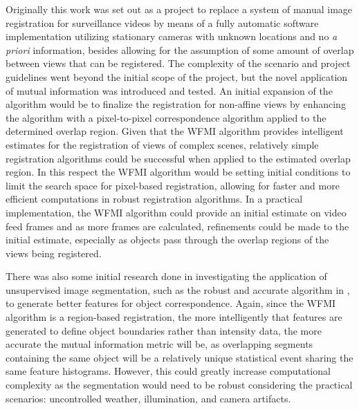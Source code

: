%
%
%
%
%
%

%
%
%



Originally this work was set out as a project to replace a system of manual image registration for surveillance videos by means of a fully automatic software implementation utilizing stationary cameras with unknown locations and no \textit{a priori} information, besides allowing for the assumption of some amount of overlap between views that can be registered. The complexity of the scenario and project guidelines went beyond the initial scope of the project, but the novel application of mutual information was introduced and tested. An initial expansion of the algorithm would be to finalize the registration for non-affine views by enhancing the algorithm with a pixel-to-pixel correspondence algorithm applied to the determined overlap region. Given that the WFMI algorithm provides intelligent estimates for the registration of views of complex scenes, relatively simple registration algorithms could be successful when applied to the estimated overlap region. In this respect the WFMI algorithm would be setting initial conditions to limit the search space for pixel-based registration, allowing for faster and more efficient computations in robust registration algorithms. In a practical implementation, the WFMI algorithm could provide an initial estimate on video feed frames and as more frames are calculated, refinements could be made to the initial estimate, especially as objects pass through the overlap regions of the views being registered.

There was also some initial research done in investigating the application of unsupervised image segmentation, such as the robust and accurate algorithm in \cite{Ugarriza2009}, to generate better features for object correspondence. Again, since the WFMI algorithm is a region-based registration, the more intelligently that features are generated to define object boundaries rather than intensity data, the more accurate the mutual information metric will be, as overlapping segments containing the same object will be a relatively unique statistical event sharing the same feature histograms. However, this could greatly increase computational complexity as the segmentation would need to be robust considering the practical scenarios: uncontrolled weather, illumination, and camera artifacts.

